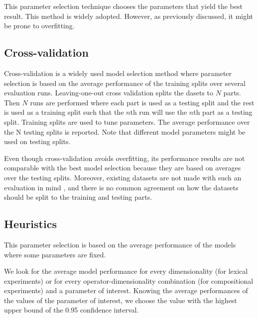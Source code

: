 This parameter selection technique chooses the parameters that yield the best result. This method is widely adopted.
However, as previously discussed, it might be prone to overfitting.
%
%

\subsection{Cross-validation}

Cross-validation \cite{Ney1997} is a widely used model selection method where parameter selection is based on the average performance of the training splits over several evaluation runs. Leaving-one-out cross validation splits the dasets to $N$ parts. Then $N$ runs are performed where each part is used as a testing split and the rest is used as a training split such that the $n$th run will use the $n$th part as a testing split. Training splits are used to tune parameters. The average performance over the N testing splits is reported. Note that different model parameters might be used on testing splits.

Even though cross-validation avoids overfitting, its performance results are not comparable with the best model selection because they are based on averages over the testing splits. Moreover, existing datasets are not made with such an evaluation in mind \cite{W16-2506}, and there is no common agreement on how the datasets should be split to the training and testing parts.

\subsection{Heuristics}

This parameter selection is based on the average performance of the models where some parameters are fixed.

We look for the average model performance for every dimensionality (for lexical experiments) or for every operator-dimensionality combination (for compositional experiments) and a parameter of interest. Knowing the average performances of the values of the parameter of interest, we choose the value with the highest upper bound of the 0.95 confidence interval.

